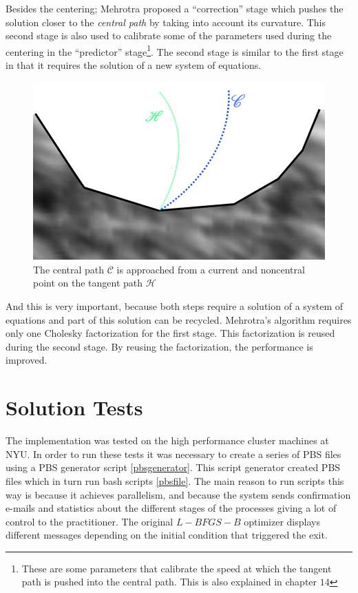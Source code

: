 Besides the centering; Mehrotra proposed a ``correction'' stage which pushes the solution closer to the \emph{central path} by taking into account its curvature. This second stage is also used to calibrate some of the parameters used during the centering in the ``predictor'' stage\footnote{These are some parameters that calibrate the speed at which the tangent path is pushed into the central path. This is also explained in chapter $14$\citep{nocedal}}. The second stage is similar to the first stage in that it requires the solution of a new system of equations.

\begin{figure}
\begin{center}
\includegraphics[scale=0.3]{Figures/CentralPath.png}
\caption[The Central Path and the Tangent Path]{The central path $\mathcal{C}$ is approached from a current and noncentral point on the tangent path $\mathcal{H}$}
\end{center}
\end{figure}

And this is very important, because both steps require a solution of a system of equations and part of this solution can be recycled. Mehrotra's algorithm requires only one Cholesky factorization for the first stage. This factorization is reused during the second stage. By reusing the factorization, the performance is improved.

\chapter{Solution Tests}

The implementation was tested on the high performance cluster machines at NYU. In order to run these tests it was necessary to create a series of PBS files using a PBS generator script \ref{pbsgenerator}. This script generator created PBS files which in turn run bash scripts \ref{pbsfile}. The main reason to run scripts this way is because it achieves parallelism, and because the system sends confirmation e-mails and statistics about the different stages of the processes giving a lot of control to the practitioner. The original $L-BFGS-B$ optimizer displays different messages depending on the initial condition that triggered the exit.  

